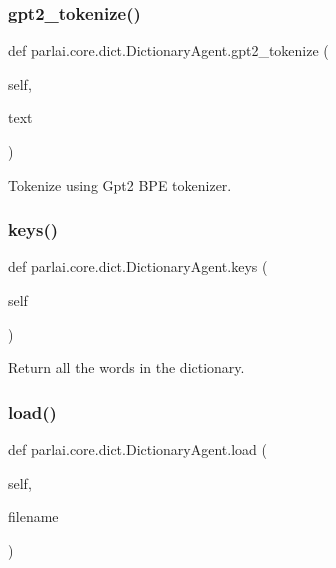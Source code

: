 \subsubsection{\texorpdfstring{gpt2\+\_\+tokenize()}{gpt2\_tokenize()}}
{\footnotesize\ttfamily def parlai.\+core.\+dict.\+Dictionary\+Agent.\+gpt2\+\_\+tokenize (\begin{DoxyParamCaption}\item[{}]{self,  }\item[{}]{text }\end{DoxyParamCaption})}

\begin{DoxyVerb}Tokenize using Gpt2 BPE tokenizer.
\end{DoxyVerb}
 \mbox{\label{classparlai_1_1core_1_1dict_1_1DictionaryAgent_ad5abcf174648d88f2383cba7a361dd29}} 
\subsubsection{\texorpdfstring{keys()}{keys()}}
{\footnotesize\ttfamily def parlai.\+core.\+dict.\+Dictionary\+Agent.\+keys (\begin{DoxyParamCaption}\item[{}]{self }\end{DoxyParamCaption})}

\begin{DoxyVerb}Return all the words in the dictionary.
\end{DoxyVerb}
 \mbox{\label{classparlai_1_1core_1_1dict_1_1DictionaryAgent_aa4229d1ba17932f588e15067afd9bf42}} 
\subsubsection{\texorpdfstring{load()}{load()}}
{\footnotesize\ttfamily def parlai.\+core.\+dict.\+Dictionary\+Agent.\+load (\begin{DoxyParamCaption}\item[{}]{self,  }\item[{}]{filename }\end{DoxyParamCaption})}

